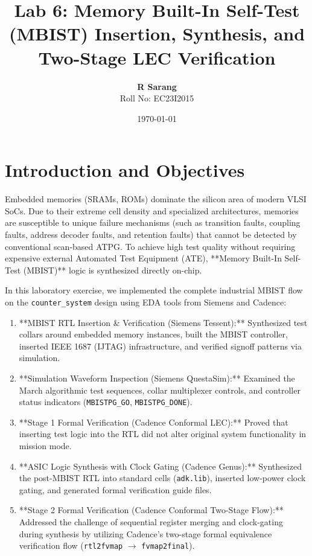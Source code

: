 \documentclass[12pt]{article}
\title{\textbf{Lab 6: Memory Built-In Self-Test (MBIST) Insertion, Synthesis, and Two-Stage LEC Verification}}
\author{\textbf{R Sarang} \\ Roll No: EC23I2015}
\date{\today}
\begin{document}
\maketitle
\tableofcontents
\newpage

\section{Introduction and Objectives}

Embedded memories (SRAMs, ROMs) dominate the silicon area of modern VLSI SoCs. Due to their extreme cell density and specialized architectures, memories are susceptible to unique failure mechanisms (such as transition faults, coupling faults, address decoder faults, and retention faults) that cannot be detected by conventional scan-based ATPG. To achieve high test quality without requiring expensive external Automated Test Equipment (ATE), **Memory Built-In Self-Test (MBIST)** logic is synthesized directly on-chip.

In this laboratory exercise, we implemented the complete industrial MBIST flow on the \texttt{counter\_system} design using EDA tools from Siemens and Cadence:
\begin{enumerate}
    \item **MBIST RTL Insertion \& Verification (Siemens Tessent):** Synthesized test collars around embedded memory instances, built the MBIST controller, inserted IEEE 1687 (IJTAG) infrastructure, and verified signoff patterns via simulation.
    \item **Simulation Waveform Inspection (Siemens QuestaSim):** Examined the March algorithmic test sequences, collar multiplexer controls, and controller status indicators (\texttt{MBISTPG\_GO}, \texttt{MBISTPG\_DONE}).
    \item **Stage 1 Formal Verification (Cadence Conformal LEC):** Proved that inserting test logic into the RTL did not alter original system functionality in mission mode.
    \item **ASIC Logic Synthesis with Clock Gating (Cadence Genus):** Synthesized the post-MBIST RTL into standard cells (\texttt{adk.lib}), inserted low-power clock gating, and generated formal verification guide files.
    \item **Stage 2 Formal Verification (Cadence Conformal Two-Stage Flow):** Addressed the challenge of sequential register merging and clock-gating during synthesis by utilizing Cadence's two-stage formal equivalence verification flow (\texttt{rtl2fvmap} $\to$ \texttt{fvmap2final}).
\end{enumerate}
\end{document}
